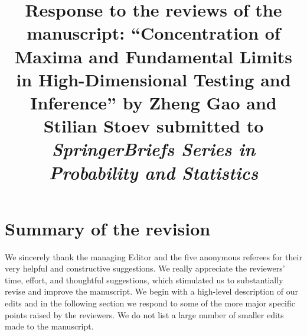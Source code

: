 \documentclass[11pt]{article}
\title{Response to the reviews of the manuscript: ``Concentration of Maxima and Fundamental Limits in High-Dimensional Testing and Inference'' by Zheng Gao
and Stilian Stoev submitted to {\em SpringerBriefs Series in Probability and Statistics} }
\begin{document}
 \maketitle
 
 \section{Summary of the revision}
 
 We sincerely thank the managing Editor and the five anonymous referees for their very helpful and constructive suggestions.  We really 
 appreciate the reviewers' time, effort, and thoughtful suggestions, which stimulated us to substantially revise and improve the manuscript.
 We begin with a high-level description of our edits and in the following section we respond to some of the more major 
 specific points raised by the reviewers.  We do not list a large number of smaller edits made to the manuscript.
 
\end{document}
